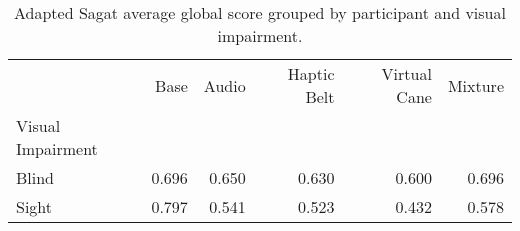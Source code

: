 
\begin{table}[!htb]
\centering
\caption{Adapted Sagat average global score grouped by participant and visual impairment.}
\label{tab:sagat_average_group}
\begin{tabular}{lrrrrr}
\toprule
{} &  Base &  Audio &  Haptic Belt &  Virtual Cane &  Mixture \\
Visual Impairment &       &        &              &               &          \\
\midrule
Blind             & 0.696 &  0.650 &        0.630 &         0.600 &    0.696 \\
Sight             & 0.797 &  0.541 &        0.523 &         0.432 &    0.578 \\
\bottomrule
\end{tabular}
\end{table}

